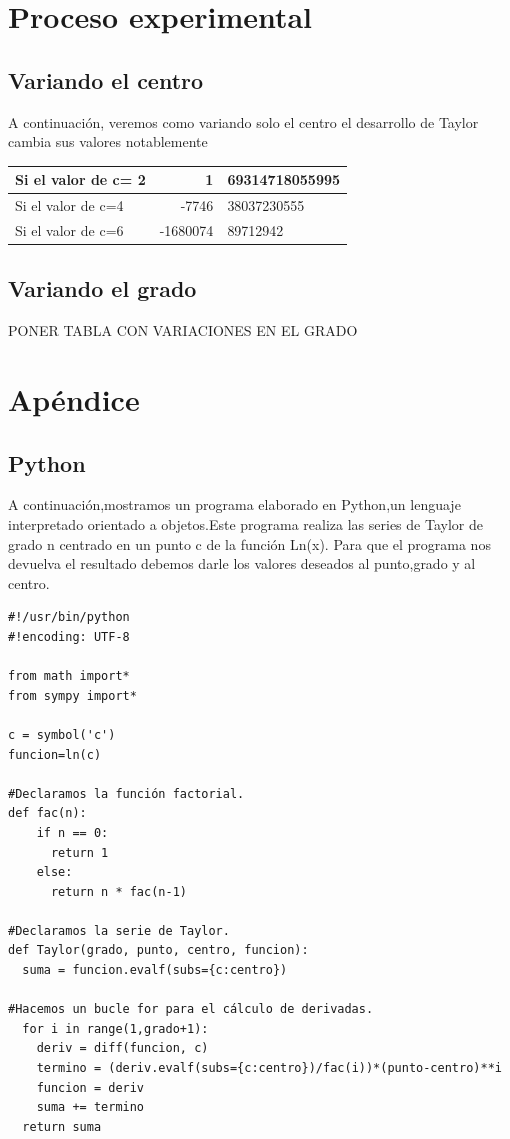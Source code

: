 \documentclass{beamer}
\begin{document}
\section{Proceso experimental}
\subsection{Variando el centro}
\begin{frame}
A continuación, veremos como variando solo el centro el desarrollo de Taylor cambia sus valores notablemente

\begin{tabular}{|l | r@{,}l |}
\hline
Si el valor de c= 2 &  1 & 69314718055995\\
\hline
Si el valor de c=4  & -7746 & 38037230555\\
\hline
Si el valor de c=6  & -1680074 & 89712942
\\
\hline
\end{tabular}

\end{frame}

\subsection{Variando el grado}
\begin{frame}

PONER TABLA CON VARIACIONES EN EL GRADO

\end{frame}


\section{Apéndice}

\subsection{Python}
\begin{frame}[fragile]
A continuación,mostramos un programa elaborado en Python,un lenguaje interpretado orientado a objetos.Este programa realiza las series de Taylor de grado n centrado en un punto c de la función Ln(x).
Para que el programa nos devuelva el resultado debemos darle los valores deseados al punto,grado y al centro. 
\begin{verbatim}
#!/usr/bin/python
#!encoding: UTF-8

from math import*
from sympy import*     

c = symbol('c')   
funcion=ln(c)

#Declaramos la función factorial.
def fac(n):    
    if n == 0:
      return 1
    else:
      return n * fac(n-1)

#Declaramos la serie de Taylor.
def Taylor(grado, punto, centro, funcion):   
  suma = funcion.evalf(subs={c:centro}) 
  
#Hacemos un bucle for para el cálculo de derivadas. 
  for i in range(1,grado+1):                
    deriv = diff(funcion, c)
    termino = (deriv.evalf(subs={c:centro})/fac(i))*(punto-centro)**i
    funcion = deriv
    suma += termino
  return suma  
\end{verbatim}
\end{frame}
\end{document}
